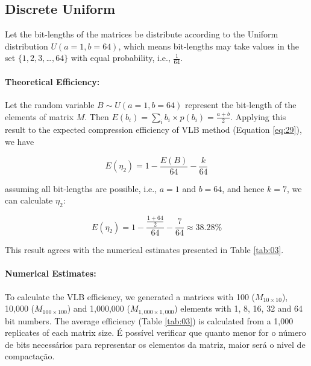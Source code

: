 \documentclass[10pt]{article}
\begin{document}
\subsection*{Discrete Uniform}
Let the bit-lengths of the matrices be distribute according to the Uniform distribution $U(a=1,b=64)$, which means bit-lengths may take values in the set $\{1, 2, 3, $\ldots$, 64\}$ with equal probability, i.e., $\frac{1}{64}$. 

\paragraph{Theoretical Efficiency:}
Let the random variable $B \sim U(a=1,b=64)$ represent the  bit-length of the elements of matrix $M$. Then $E(b_i) = \sum_{i} b_i \times p(b_i) = \frac{a+b}{2}$.  Applying this result to the expected compression efficiency of VLB method (Equation \ref{eq:29}), we have 

\begin{equation}\label{eq:44}
 E(\eta_2) = 1 - \frac{E(B)}{64} - \frac{k}{64} 
\end{equation}

assuming all bit-lengths are possible, i.e., $a=1$ and $b=64$, and hence $k=7$, we can calculate $\eta_2$:

\begin{equation}\label{eq:45}
 E(\eta_2) = 1 - \frac{\frac{1+64}{2}}{64} - \frac{7}{64} \approx 38.28\% 
\end{equation}

This result agrees with the numerical estimates presented in Table \ref{tab:03}.

\paragraph{Numerical Estimates:}
To calculate the VLB efficiency, we generated a matrices with 100 ($M_{10 \times 10}$), 10,000 ($M_{100 \times 100}$) and 1,000,000 ($M_{1,000 \times 1,000}$) elements with 1, 8, 16, 32 and 64 bit numbers.  The average efficiency (Table \ref{tab:03}) is calculated from a 1,000 replicates of each matrix size. É possível verificar que quanto menor for o número de bits necessários para representar os elementos da matriz, maior será o nivel de compactação.
\end{document}
